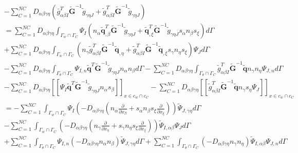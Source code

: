 \begin{equation}
\begin{split}
    &-\sum_{C=1}^{N\!C}D_{\alpha\beta\gamma\eta}(\bar{g}_{\alpha\beta I}^T\tilde{\pmb G}^{-1}\tilde{g}_{\gamma\eta J}+\tilde{g}_{\alpha\beta I}^T\tilde{\pmb G}^{-1}\tilde{g}_{\gamma\eta J})\\
    &=\sum_{C=1}^{N\!C}D_{\alpha\beta\gamma\eta}\int_{{\Gamma_w}\cap{\Gamma_C}}\Psi_I(n_{\alpha}
    \tilde{\pmb q}_{,\beta}^T\tilde{\pmb G}^{-1}\tilde{g}_{\gamma\eta J}+\tilde{\pmb q}_{,\xi}^T\tilde{\pmb G}^{-1}\tilde{g}_{\gamma\eta J}s_{\alpha}n_{\beta}s_{\xi})d\Gamma\\
    &+\sum_{C=1}^{N\!C}D_{\alpha\beta\gamma\eta}\int_{{\Gamma_w}\cap{\Gamma_C}}(n_{\gamma}
    \tilde{g}_{\alpha\beta I}^T\tilde{\pmb G}^{-1}\tilde{\pmb q}_{,\eta}+\tilde{g}_{\alpha\beta I}^T
    \tilde{\pmb G}^{-1}\tilde{\pmb q}_{,\xi}s_{\gamma}n_{\eta}s_{\xi})\Psi_Jd\Gamma\\
    &-\sum_{C=1}^{N\!C}D_{\alpha\beta\gamma\eta}\int_{{\Gamma_{\theta}}\cap{\Gamma_C}}\Psi_{I,n}
    \tilde{\pmb q}^T\tilde{\pmb G}^{-1}\tilde{g}_{\gamma\eta J}n_{\alpha}n_{\beta}d\Gamma
    -\sum_{C=1}^{N\!C}D_{\alpha\beta\gamma\eta}\int_{{\Gamma_{\theta}}\cap{\Gamma_C}}
    \tilde{g}_{\alpha\beta I}^T\tilde{\pmb G}^{-1}\tilde{\pmb q}n_{\gamma}n_{
    \eta}\Psi_{J,n}d\Gamma\\
    &-\sum_{C=1}^{N\!C}D_{\alpha\beta\gamma\eta}[[\Psi_I\tilde{\pmb q}^T\tilde{\pmb G}^{-1}\tilde{g}_{\gamma\eta J}n_{\alpha}s_{\beta}]]_{x\in{c_w}\cap{c_C}}
    -\sum_{C=1}^{N\!C}D_{\alpha\beta\gamma\eta}[[\tilde{g}_{\alpha\beta I}^T\tilde{\pmb G}^{-1}\tilde{\pmb q}n_{\gamma}s_{\eta}\Psi_J]]_{x\in{c_w}\cap{c_C}}\\
    &=-\sum_{C=1}^{N\!C}\int_{{\Gamma_w}\cap{\Gamma_C}}\Psi_I(-D_{\alpha\beta\gamma\eta}(n_{\alpha}\frac{\partial}{\partial x_{\beta}}+s_{\alpha}n_{\beta}s_{\xi}\frac{\partial}{\partial x_{\xi}}))\tilde{\Psi}_{J,\gamma\eta}d\Gamma\\
    &-\sum_{C=1}^{N\!C}\int_{{\Gamma_w}\cap{\Gamma_C}}(-D_{\alpha\beta\gamma\eta}(n_{\gamma}\frac{\partial}{\partial x_{\eta}}+s_{\gamma}n_{\eta}s_{\xi}\frac{\partial}{\partial x_{\xi}}))\tilde{\Psi}_{I,\alpha\beta}\Psi_Jd\Gamma\\
    &+\sum_{C=1}^{N\!C}\int_{{\Gamma_{\theta}}\cap{\Gamma_C}}\Psi_{I,n}(-D_{\alpha\beta\gamma\eta}n_{\alpha}n_{\beta})\tilde{\Psi}_{J,\gamma\eta}d\Gamma
    +\sum_{C=1}^{N\!C}\int_{{\Gamma_{\theta}}\cap{\Gamma_C}}(-D_{\alpha\beta\gamma\eta}n_{\gamma}n_{\eta})\tilde{\Psi}_{I,\alpha\beta}\Psi_{J,n}d\Gamma\\

\end{split}
\end{equation}
